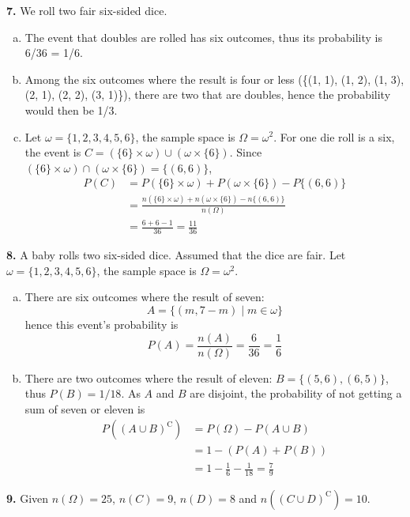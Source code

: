 \documentclass[a4paper,12pt]{article}
\newcommand{\C}{\mathrm C}
\newcommand{\exercise}[1]{\noindent\textbf{#1.}}
\begin{document}
\exercise 7  We roll two fair six-sided dice.
\begin{enumerate}[(a)]
  \item The event that doubles are rolled has six outcomes, thus its probability
    is 6/36 = 1/6.
  \item Among the six outcomes where the result is four or less
    (\{(1, 1), (1, 2), (1, 3), (2, 1), (2, 2), (3, 1)\}),
    there are two that are doubles, hence the probability would then be 1/3.
  \item Let $\omega = \{1, 2, 3, 4, 5, 6\}$,
    the sample space is $\Omega = \omega^2$.  For one die roll is a six,
    the event is $C = (\{6\}\times\omega) \cup (\omega\times\{6\})$.
    Since $(\{6\}\times\omega) \cap (\omega\times\{6\}) = \{(6, 6)\}$,
    \begin{align*}
      P(C) &= P(\{6\}\times\omega) + P(\omega\times\{6\}) - P\{(6, 6)\}\\
      &= \frac{n(\{6\}\times\omega) + n(\omega\times\{6\}) - n\{(6, 6)\}}
              {n(\Omega)}\\
      &= \frac{6 + 6 - 1}{36} = \frac{11}{36}
    \end{align*}
\end{enumerate}

\exercise 8  A baby rolls two six-sided dice.  Assumed that the dice are fair.
Let $\omega = \{1, 2, 3, 4, 5, 6\}$, the sample space is $\Omega = \omega^2$.
\begin{enumerate}[(a)]
  \item There are six outcomes where the result of seven:
    \[A = \{(m, 7 - m) \mid m \in \omega\}\]
    hence this event's probability is
    \[P(A) = \frac{n(A)}{n(\Omega)} = \frac{6}{36} = \frac{1}{6}\]
  \item There are two outcomes where the result of eleven:
    $B = \{(5, 6), (6, 5)\}$, thus $P(B) = 1/18$.
    As $A$ and $B$ are disjoint, the probability of not getting
    a sum of seven or eleven is
    \begin{align*}
      P\left((A\cup B)^\C\right) &= P(\Omega) - P(A\cup B)\\
      &= 1 - (P(A) + P(B))\\
      &= 1 - \frac{1}{6} - \frac{1}{18} = \frac{7}{9}
    \end{align*}
\end{enumerate}

\exercise 9  Given $n(\Omega) = 25$, $n(C) = 9$, $n(D) = 8$
and $n\left((C\cup D)^\C\right) = 10$.
\end{document}

